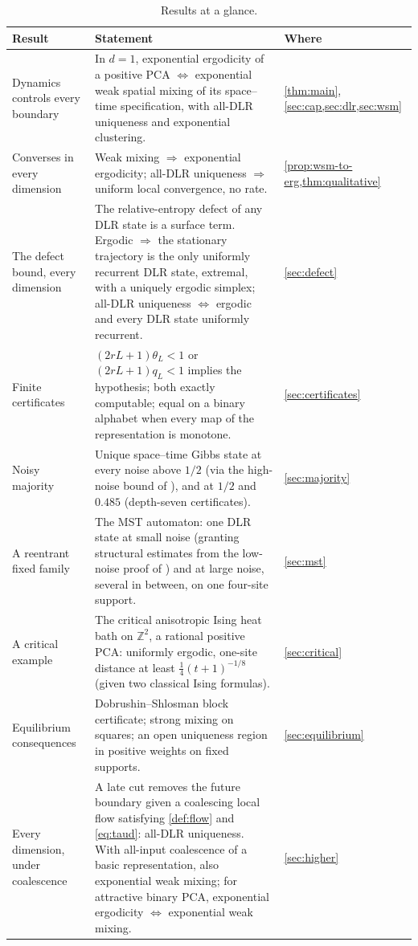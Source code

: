 \documentclass[11pt]{article}
\theoremstyle{plain}
\theoremstyle{definition}
\theoremstyle{remark}
\newcommand{\Z}{\mathbb{Z}}
\begin{document}
\begin{table}[tp]
\centering\small
\begin{tabularx}{\textwidth}{@{}>{\raggedright\arraybackslash}p{} X >{\raggedright\arraybackslash}p{}@{}}
\toprule
Result & Statement & Where\\
\midrule
Dynamics controls every boundary & In $d=1$, exponential ergodicity of a positive PCA $\Leftrightarrow$ exponential weak spatial mixing of its space--time specification, with all-DLR uniqueness and exponential clustering. & \cref{thm:main}, \cref{sec:cap,sec:dlr,sec:wsm}\\[3pt]
Converses in every dimension & Weak mixing $\Rightarrow$ exponential ergodicity; all-DLR uniqueness $\Rightarrow$ uniform local convergence, no rate. & \cref{prop:wsm-to-erg,thm:qualitative}\\[3pt]
The defect bound, every dimension & The relative-entropy defect of any DLR state is a surface term. Ergodic $\Rightarrow$ the stationary trajectory is the only uniformly recurrent DLR state, extremal, with a uniquely ergodic simplex; all-DLR uniqueness $\Leftrightarrow$ ergodic and every DLR state uniformly recurrent. & \cref{sec:defect}\\[3pt]
Finite certificates & $(2rL+1)\theta_L<1$ or $(2rL+1)q_L<1$ implies the hypothesis; both exactly computable; equal on a binary alphabet when every map of the representation is monotone. & \cref{sec:certificates}\\[3pt]
Noisy majority & Unique space--time Gibbs state at every noise above $1/2$ (via the high-noise bound of \cite{LMS90}), and at $1/2$ and $0.485$ (depth-seven certificates). & \cref{sec:majority}\\[3pt]
A reentrant fixed family & The MST automaton: one DLR state at small noise (granting structural estimates from the low-noise proof of \cite{MST26}) and at large noise, several in between, on one four-site support. & \cref{sec:mst}\\[3pt]
A critical example & The critical anisotropic Ising heat bath on $\Z^2$, a rational positive PCA: uniformly ergodic, one-site distance at least $\frac14(t+1)^{-1/8}$ (given two classical Ising formulas). & \cref{sec:critical}\\[3pt]
Equilibrium consequences & Dobrushin--Shlosman block certificate; strong mixing on squares; an open uniqueness region in positive weights on fixed supports. & \cref{sec:equilibrium}\\[3pt]
Every dimension, under coalescence & A late cut removes the future boundary given a coalescing local flow satisfying \cref{def:flow} and \eqref{eq:taud}: all-DLR uniqueness. With all-input coalescence of a basic representation, also exponential weak mixing; for attractive binary PCA, exponential ergodicity $\Leftrightarrow$ exponential weak mixing. & \cref{sec:higher}\\
\bottomrule
\end{tabularx}
\caption{Results at a glance.}
\label{tab:glance}
\end{table}
\end{document}
